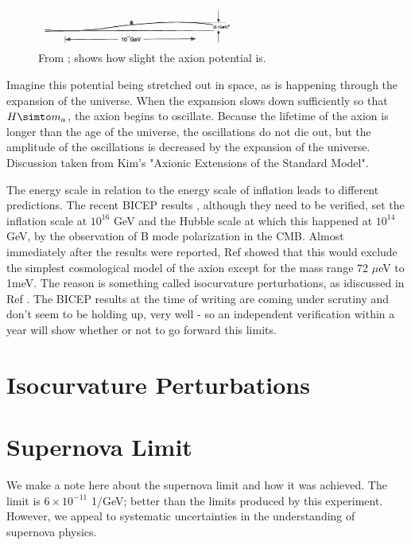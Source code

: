 \documentclass[12pt,twosides]{book}
\begin{document}
\begin{figure}
\includegraphics[width=0.6\textwidth]{axionpotential}
\caption{From \cite{kim95}; shows how slight the axion potential is.}
\end{figure}

Imagine this potential being stretched out in space, as is happening through the expansion of the universe. When the expansion slows down sufficiently so that $H \simto m_a$, the axion begins to oscillate. Because the lifetime of the axion is longer than the age of the universe, the oscillations do not die out, but the amplitude of the oscillations is decreased by the expansion of the universe. Discussion taken from Kim's "Axionic Extensions of the Standard Model".

The energy scale in relation to the energy scale of inflation leads to different predictions. The recent BICEP results \cite{bicep14}, although they need to be verified, set the inflation scale at $10^16$ GeV and the Hubble scale at which this happened at $10^14$ GeV, by the observation of B mode polarization in the CMB. Almost immediately after the results were reported, Ref \cite{visinelli14} showed that this would exclude the simplest cosmological model of the axion except for the mass range 72 $\mu$eV to 1meV. The reason is something called isocurvature perturbations, as idiscussed in Ref \cite{fox04}. The BICEP results at the time of writing are coming under scrutiny and don't seem to be holding up, very well - so an independent verification within a year will show whether or not to go forward this limits.

\section{Isocurvature Perturbations}


\section{Supernova Limit}

We make a note here about the supernova limit and how it was achieved. The limit is $6 \times 10^{-11}$ 1/GeV; better than the limits produced by this experiment. However, we appeal to systematic uncertainties in the understanding of supernova physics.
\end{document}
